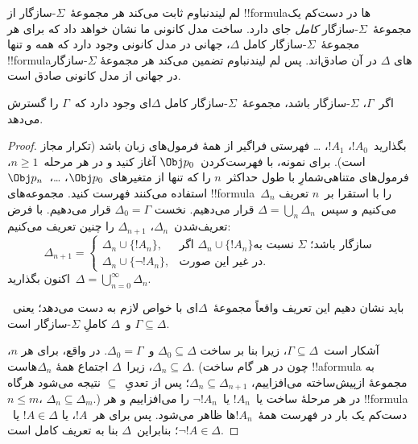 \documentclass[../../../include/open-logic-section]{subfiles}
\begin{document}


لم لیندنباوم ثابت می‌کند هر مجموعهٔ~$\Sigma$-سازگار از !!{formula}ها
در دست‌کم یک مجموعهٔ~$\Sigma$-سازگار \emph{کامل} جای دارد. ساخت مدل
کانونی ما نشان خواهد داد که برای هر مجموعهٔ~$\Sigma$-سازگار کامل
$\Delta$، جهانی در مدل کانونی وجود دارد که همه و تنها !!{formula}های
$\Delta$ در آن صادق‌اند. پس لم لیندنباوم تضمین می‌کند هر مجموعهٔ
$\Sigma$-سازگار در جهانی از مدل کانونی صادق است.

\begin{thm}[لم لیندنباوم]
  اگر~$\Gamma$، $\Sigma$-سازگار باشد، مجموعهٔ~$\Sigma$-سازگار کامل
  $\Delta$ای وجود دارد که~$\Gamma$ را گسترش می‌دهد.
\end{thm}

\begin{proof}
بگذارید~$!A_0$، $!A_1$، \dots{} فهرستی فراگیر از همهٔ فرمول‌های زبان
باشد (تکرار مجاز است). برای نمونه، با فهرست‌کردن~$\Obj p_0$ آغاز کنید
و در هر مرحله~$n \ge 1$، فرمول‌های متناهی‌شمارِ با طول حداکثر~$n$ را
که تنها از متغیرهای~$\Obj p_0$، \dots،~$\Obj p_n$ استفاده می‌کنند
فهرست کنید. مجموعه‌های !!{formula}~$\Delta_n$ را با استقرا بر~$n$
تعریف می‌کنیم و سپس~$\Delta = \bigcup_n \Delta_n$ قرار می‌دهیم. نخست
$\Delta_0 = \Gamma$ قرار می‌دهیم. با فرض تعریف‌شدن~$\Delta_n$،
$\Delta_{n+1}$ را چنین تعریف می‌کنیم:
\[
\Delta_{n+1} =
\begin{cases}
  \Delta_n \cup \{!A_n\}, & \text{اگر~$\Delta_n \cup \{ !A_n\}$
    نسبت به~$\Sigma$ سازگار باشد؛} \\
  \Delta_n \cup \{ \lnot !A_n\}, & \text{در غیر این صورت.}
\end{cases}
\]
اکنون بگذارید~$\Delta = \bigcup_{n=0}^\infty \Delta_n$.

باید نشان دهیم این تعریف واقعاً مجموعهٔ~$\Delta$ای با خواص لازم به دست
می‌دهد؛ یعنی~$\Gamma \subseteq \Delta$ و~$\Delta$ کاملِ
$\Sigma$-سازگار است.

آشکار است~$\Gamma \subseteq \Delta$، زیرا بنا بر ساخت
$\Delta_0 \subseteq \Delta$ و~$\Delta_0 = \Gamma$. در واقع، برای هر
$n$، $\Delta_n \subseteq \Delta$، زیرا~$\Delta$ اجتماع همهٔ
$\Delta_n$هاست. (چون در هر گام ساخت !!a{formula} به مجموعهٔ ازپیش‌ساخته
می‌افزاییم، $\Delta_n \subseteq \Delta_{n+1}$؛ پس از تعدیِ~$\subseteq$
نتیجه می‌شود هرگاه~$n \le m$، $\Delta_n \subseteq \Delta_m$.) در هر
مرحلهٔ ساخت یا~$!A_n$ یا~$\lnot !A_n$ را می‌افزاییم و هر !!{formula}
دست‌کم یک بار در فهرست همهٔ~$!A_n$ها ظاهر می‌شود. پس برای هر~$!A$، یا
$!A \in \Delta$ یا~$\lnot !A \in \Delta$؛ بنابراین~$\Delta$ بنا به
تعریف کامل است.


\end{proof}
\end{document}
